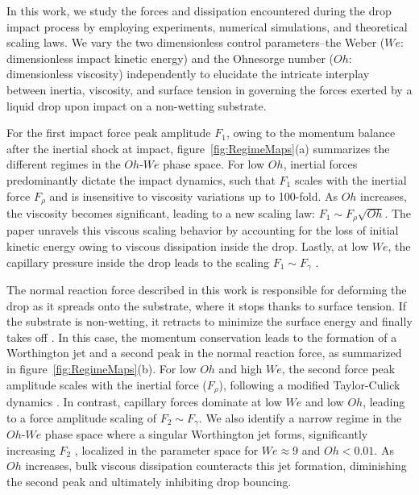 \documentclass{jfm}
\begin{document}
In this work, we study the forces and dissipation encountered during the drop impact process by employing experiments, numerical simulations, and theoretical scaling laws. We vary the two dimensionless control parameters--the Weber ($We$: dimensionless impact kinetic energy) and the Ohnesorge number ($Oh$: dimensionless viscosity) independently to elucidate the intricate interplay between inertia, viscosity, and surface tension in governing the forces exerted by a liquid drop upon impact on a non-wetting substrate.

For the first impact force peak amplitude $F_1$, owing to the momentum balance after the inertial shock at impact, figure~\ref{fig:RegimeMaps}(a) summarizes the different regimes in the $Oh$-$We$ phase space. For low $Oh$, inertial forces predominantly dictate the impact dynamics, such that $F_1$ scales with the inertial force $F_\rho$ \citep{Philippi2016, Gordillo2018, Mitchell2019, cheng2021drop, zhang2022impact} and is insensitive to viscosity variations up to 100-fold. As $Oh$ increases, the viscosity becomes significant, leading to a new scaling law: $F_1 \sim F_\rho\sqrt{Oh}$. The paper unravels this viscous scaling behavior by accounting for the loss of initial kinetic energy owing to viscous dissipation inside the drop. Lastly, at low $We$, the capillary pressure inside the drop leads to the scaling $F_1 \sim F_\gamma$ \citep{molavcek2012quasi, chevy2012liquid}. 

The normal reaction force described in this work is responsible for deforming the drop as it spreads onto the substrate, where it stops thanks to surface tension. If the substrate is non-wetting, it retracts to minimize the surface energy and finally takes off \citep{Richard2000}. In this case, the momentum conservation leads to the formation of a Worthington jet and a second peak in the normal reaction force, as summarized in figure~\ref{fig:RegimeMaps}(b). For low $Oh$ and high $We$, the second force peak amplitude scales with the inertial force ($F_\rho$), following a modified Taylor-Culick dynamics \citep{Eggers2010}. In contrast, capillary forces dominate at low $We$ and low $Oh$, leading to a force amplitude scaling of $F_2 \sim F_\gamma$. We also identify a narrow regime in the $Oh$-$We$ phase space where a singular Worthington jet forms, significantly increasing $F_2$ \citep{Bartolo2006Singular, zhang2022impact}, localized in the parameter space for $We \approx 9$ and $Oh < 0.01$. As $Oh$ increases, bulk viscous dissipation counteracts this jet formation, diminishing the second peak and ultimately inhibiting drop bouncing. 
\end{document}
